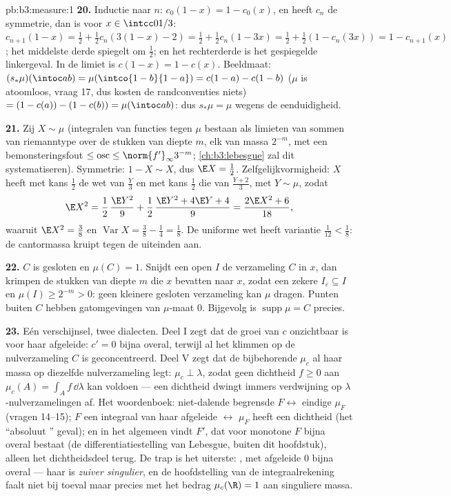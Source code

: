 \begin{solution}{pb:b3:measure:1}
\textbf{20.} Inductie naar $n$: $c_0(1-x) = 1 - c_0(x)$, en heeft
$c_n$ de symmetrie, dan is voor $x \in \intcc0{1/3}$:
$c_{n+1}(1 - x) = \frac12 + \frac12c_n(3(1-x) - 2) = \frac12 +
\frac12c_n(1 - 3x) = \frac12 + \frac12(1 - c_n(3x)) = 1 -
c_{n+1}(x)$; het middelste derde spiegelt om $\frac12$; en het
rechterderde is het gespiegelde linkergeval. In de limiet is $c(1-x)
= 1 - c(x)$. Beeldmaat: $(s_*\mu)(\intoc ab) =
\mu(\intco{1-b}{1-a}) = c(1-a) - c(1-b)$ ($\mu$ is atoomloos,
vraag 17, dus kosten de randconventies niets) $= (1 - c(a)) - (1 -
c(b)) = \mu(\intoc ab)$: dus $s_*\mu = \mu$ wegens de
eenduidigheid.

\textbf{21.} Zij $X \sim \mu$ (integralen van  functies
tegen $\mu$ bestaan als limieten van sommen van riemanntype over
de stukken van diepte $m$, elk van massa $2^{-m}$, met een
bemonsteringsfout $\leq \operatorname{osc} \leq
\norm{f'}_\infty3^{-m}$; \cref{ch:b3:lebesgue} zal dit
systematiseren). Symmetrie: $1 - X \sim X$, dus $\E X = \frac12$.
Zelfgelijkvormigheid: $X$ heeft met kans $\frac12$ de wet van
$\frac Y3$ en met kans $\frac12$ die van $\frac{Y+2}3$, met $Y
\sim \mu$, zodat
\[
\E X^2 = \frac12\,\frac{\E Y^2}9 + \frac12\,
\frac{\E Y^2 + 4\E Y + 4}{9} = \frac{2\E X^2 + 6}{18},
\]
waaruit $\E X^2 = \frac38$ en $\operatorname{Var}X = \frac38 -
\frac14 = \frac18$. De uniforme wet heeft variantie $\frac1{12} <
\frac18$: de cantormassa kruipt tegen de uiteinden aan.

\textbf{22.} $C$ is gesloten en $\mu(C) = 1$. Snijdt een open $I$
de verzameling $C$ in $x$, dan krimpen de stukken van diepte $m$
die $x$ bevatten naar $x$, zodat een zekere $I_\varepsilon
\subseteq I$ en $\mu(I) \geq 2^{-m} > 0$: geen kleinere gesloten
verzameling kan $\mu$ dragen. Punten buiten $C$ hebben
gatomgevingen van $\mu$-maat $0$. Bijgevolg is
$\operatorname{supp}\mu = C$ precies.

\textbf{23.} Eén verschijnsel, twee dialecten. Deel I zegt dat de
groei van $c$ onzichtbaar is voor haar afgeleide: $c' = 0$ bijna
overal, terwijl al het klimmen op de nulverzameling $C$ is
geconcentreerd. Deel V zegt dat de bijbehorende  $\mu_c$ al
haar massa op diezelfde nulverzameling legt: $\mu_c \perp
\lambda$, zodat geen dichtheid $f \geq 0$ aan $\mu_c(A) =
\int_Af\,\dd\lambda$ kan voldoen --- een dichtheid dwingt immers
verdwijning op $\lambda$-nulverzamelingen af. Het woordenboek:
niet-dalende begrensde $F \leftrightarrow$ eindige  $\mu_F$
(vragen 14--15); $F$ een integraal van haar afgeleide
$\leftrightarrow$ $\mu_F$ heeft een dichtheid (het ``absoluut
'' geval); en in het algemeen vindt $F'$, dat voor
monotone $F$ bijna overal bestaat (de differentiatiestelling van
Lebesgue, buiten dit hoofdstuk), alleen het dichtheidsdeel terug.
De trap is het uiterste: , met afgeleide $0$ bijna overal
--- haar  is \emph{zuiver singulier}, en de hoofdstelling van
de integraalrekening faalt niet bij toeval maar precies met het
bedrag $\mu_c(\R) = 1$ aan singuliere massa.


\end{solution}
